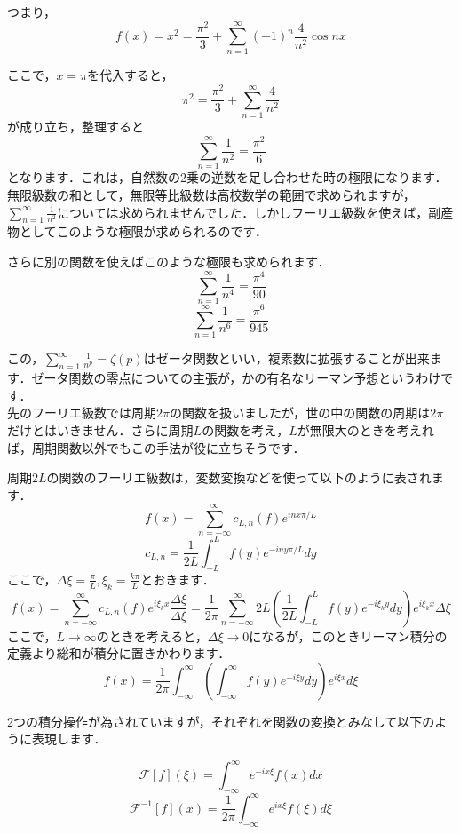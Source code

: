 つまり，
\[
  f(x) = x^2 = \frac{\pi^2}{3} + \sum_{n=1}^\infty (-1)^n \frac{4}{n^2} \cos nx
\]

ここで，$x = \pi$を代入すると，
\[
  \pi^2 = \frac{\pi^2}{3} + \sum_{n=1}^\infty \frac{4}{n^2}
\]
が成り立ち，整理すると
\[
  \sum_{n=1}^\infty \frac{1}{n^2} = \frac{\pi^2}{6}
\]
となります．これは，自然数の2乗の逆数を足し合わせた時の極限になります．\\

無限級数の和として，無限等比級数は高校数学の範囲で求められますが，$\sum_{n=1}^\infty \frac{1}{n^2}$については求められませんでした．しかしフーリエ級数を使えば，副産物としてこのような極限が求められるのです．

さらに別の関数を使えばこのような極限も求められます．
\[
  \sum_{n=1}^\infty \frac{1}{n^4} = \frac{\pi^4}{90}
\]
\[
  \sum_{n=1}^\infty \frac{1}{n^6} = \frac{\pi^6}{945}
\]

この，$\sum_{n=1}^\infty \frac{1}{n^p} = \zeta(p)$はゼータ関数といい，複素数に拡張することが出来ます．ゼータ関数の零点についての主張が，かの有名なリーマン予想というわけです．\\


先のフーリエ級数では周期$2\pi$の関数を扱いましたが，世の中の関数の周期は$2\pi$だけとはいきません．さらに周期$L$の関数を考え，$L$が無限大のときを考えれば，周期関数以外でもこの手法が役に立ちそうです．

周期$2L$の関数のフーリエ級数は，変数変換などを使って以下のように表されます．
\[
  f(x) = \sum_{n=-\infty}^\infty c_{L,n}(f) e^{inx\pi/L}
\]
\[
  c_{L,n} = \frac{1}{2L} \int_{-L}^L f(y) e^{-iny\pi/L} dy
\]
ここで，$\Delta\xi = \frac{\pi}{L},{\xi_k} = \frac{k\pi}{L}$とおきます．
\[
  f(x) = \sum_{n=-\infty}^\infty c_{L,n}(f) e^{i{\xi_k}x} \frac{\Delta\xi}{\Delta\xi}
  =\frac{1}{2\pi} \sum_{n=-\infty}^\infty 2{L}(\frac{1}{2L} \int_{-L}^L f(y) e^{-i{\xi_k}y} dy) e^{i{\xi_k}x} {\Delta\xi}
\]
ここで，$L \to \infty$のときを考えると，${\Delta\xi} \to 0$になるが，このときリーマン積分の定義より総和が積分に置きかわります．
\[
  f(x) = \frac{1}{2\pi} \int_{-\infty}^\infty (\int_{-\infty}^\infty f(y) e^{-i\xi y}dy) e^{i\xi x}d\xi
\]

2つの積分操作が為されていますが，それぞれを関数の変換とみなして以下のように表現します．

\[
  \mathcal{F}[f](\xi) = \int_{-\infty}^\infty e^{-ix\xi} f(x) dx
\]
\[
  \mathcal{F}^{-1}[f](x) = \frac{1}{2\pi} \int_{-\infty}^\infty e^{ix\xi} f(\xi) d\xi
\]


